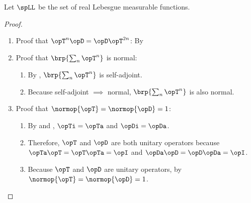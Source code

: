\begin{theorem}
\label{thm:vsmra_real}
Let $\spLL$ be the set of real Lebesgue measurable functions.
\end{theorem}
\begin{proof}
  \begin{enumerate}
    \item Proof that $\opT^n\opD = \opD\opT^{2n}$:  By 
    \item Proof that $\brp{\sum_n \opT^n}$ is normal:
      \begin{enumerate}
        \item By , $\brp{\sum_n \opT^n}$ is self-adjoint.
        \item Because self-adjoint $\implies$ normal, 
              $\brp{\sum_n \opT^n}$ is also normal.
      \end{enumerate}
    \item Proof that $\normop{\opT}=\normop{\opD}=1$: 
      \begin{enumerate}
        \item By  and ,
          $\opTi=\opTa$ and $\opDi=\opDa$.
        \item Therefore, $\opT$ and $\opD$ are both unitary operators because
          $\opTa\opT=\opT\opTa=\opI$ and $\opDa\opD=\opD\opDa=\opI$.
        \item Because $\opT$ and $\opD$ are unitary operators, 
          by 
          $\normop{\opT}=\normop{\opD}=1$.
    \end{enumerate}
  \end{enumerate}
\end{proof}



